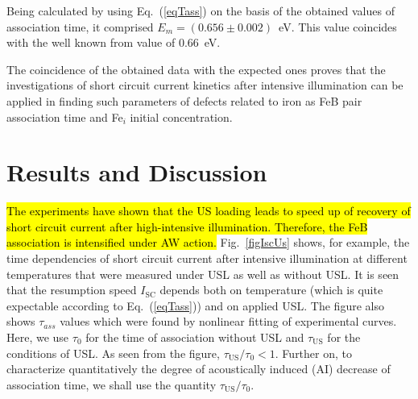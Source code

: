 \documentclass[sn-mathphys]{sn-jnl}%
\theoremstyle{thmstyleone}%
\theoremstyle{thmstyletwo}%
\theoremstyle{thmstylethree}%
\begin{document}
%
Being calculated by using Eq.~(\ref{eqTass}) on the basis of the obtained
values of association time, it comprised $E_m=(0.656\pm0.002)$~eV.
This value coincides with the well known from \cite{FeBAssJAP2014,FeBkinAPL2008} value  of 0.66~eV.

The coincidence of the obtained data with the expected ones
proves that the investigations of short circuit current kinetics
after intensive illumination can be applied in finding such parameters of defects related to iron
as FeB pair association time and Fe$_i$ initial concentration.

\section{Results and Discussion}

\hl{The experiments have shown that the US loading leads to
speed up of recovery of short circuit current after high-intensive illumination.
Therefore, the  FeB association is intensified under AW action.}
Fig.~\ref{figIscUs} shows, for example, the time dependencies of short circuit current
after intensive illumination at different temperatures
that were measured under USL as well as without USL.
It is seen that the resumption speed $I_\mathrm{SC}$ depends both on temperature
(which is quite expectable according to Eq.~(\ref{eqTass})) and on applied USL.
The figure also shows $\tau_{ass}$ values which were found by nonlinear fitting of experimental curves.
Here, we use $\tau_{0}$ for the time of association without USL
and $\tau_\mathrm{US}$ for the conditions of USL.
As seen from the figure, $\tau_\mathrm{US}/\tau_{0}< 1$.
Further on, to characterize quantitatively the degree of
acoustically induced (AI) decrease of association time, we shall use the quantity $\tau_\mathrm{US}/\tau_{0}$.
\end{document}
